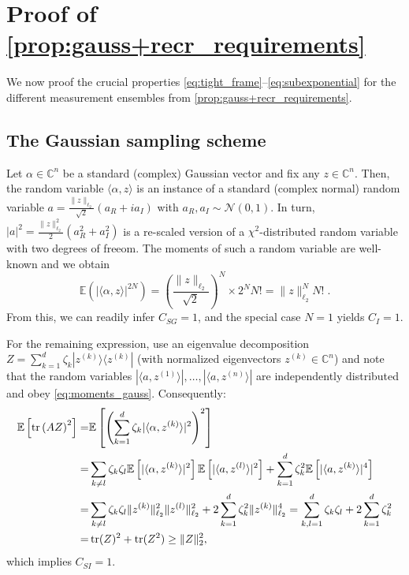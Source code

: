 \section{Proof of \cref{prop:gauss+recr_requirements}}
\label{sec:pl.gauss+recr_requirements}

We now proof the crucial properties \eqref{eq:tight_frame}--\eqref{eq:subexponential} for the different measurement ensembles from \cref{prop:gauss+recr_requirements}.

\subsection{The Gaussian sampling scheme}


Let $\alpha \in \mathbb{C}^n$ be a standard (complex) Gaussian vector and fix any $ z \in \mathbb{C}^n$.
Then, the random variable $\langle \alpha, z \rangle$ is an instance of a standard (complex normal) random variable $a = \tfrac{\|  z \|_{\ell_2}}{\sqrt{2}} \left(a_R + i a_I\right)$ with $a_R, a_I \sim \mathcal{N}(0,1)$.
In turn, $|a|^2 = \frac{\|  z \|_{\ell_2}^2}{2} (a_R^2 + a_I^2)$ is a re-scaled version of a $\chi^2$-distributed random variable with two degrees of freeom. The moments of such a random variable are well-known and we obtain
\begin{equation}
  \mathbb{E} (| \langle \alpha, z \rangle|^{2N})= \left( \frac{ \|  z \|_{\ell_2}}{\sqrt{2}}\right)^N \times 2^N N! = \|  z \|_{\ell_2}^N N! \; .\label{eq:moments_gauss}
\end{equation}
From this, we can readily infer $C_{SG} = 1$, and the special case $N=1$  yields $C_I=1$.

For the remaining expression, use an eigenvalue decomposition $ Z = \sum_{k=1}^d \zeta_k | z^{(k)} \rangle \langle  z^{(k)}|$ (with normalized eigenvectors $ z^{(k)}\in \mathbb{C}^n$) and note that the random variables $|\langle  a, z^{(1)} \rangle|,\ldots, | \langle  a, z^{(n)} \rangle|$ are independently distributed and obey \cref{eq:moments_gauss}.
Consequently:
\begin{align}
  \mathbb{E} \left[ \operatorname{tr} \left(  A  Z \right)^2 \right]
  =& \mathbb{E} \left[ \left( \sum_{k=1}^d \zeta_k | \langle \alpha, z^{(k)} \rangle|^2 \right)^2 \right] \\
  =& \sum_{k \neq l} \zeta_k \zeta_l \mathbb{E} \left[ |\langle \alpha, z^{(k)} \rangle|^2 \right] \mathbb{E} \left[ | \langle  a, z^{(l)} \rangle|^2 \right]
  + \sum_{k=1}^d \zeta_k^2 \mathbb{E} \left[ | \langle  a,  z^{(k)} \rangle|^4 \right] \\
  =& \sum_{k \neq l} \zeta_k \zeta_l \| z^{(k)} \|_{\ell_2}^2 \|  z^{(l)} \|_{\ell_2}^2 + 2 \sum_{k=1}^d \zeta_k^2 \|  z^{(k)} \|_{\ell_2}^4
  = \sum_{k,l=1}^d \zeta_k \zeta_l + 2\sum_{k=1}^d \zeta_k^2 \\
  =& \operatorname{tr} ( Z)^2 + \operatorname{tr} ( Z^2)
  \geq \|  Z \|_2^2,
\end{align}
which implies $C_{SI} = 1$.

